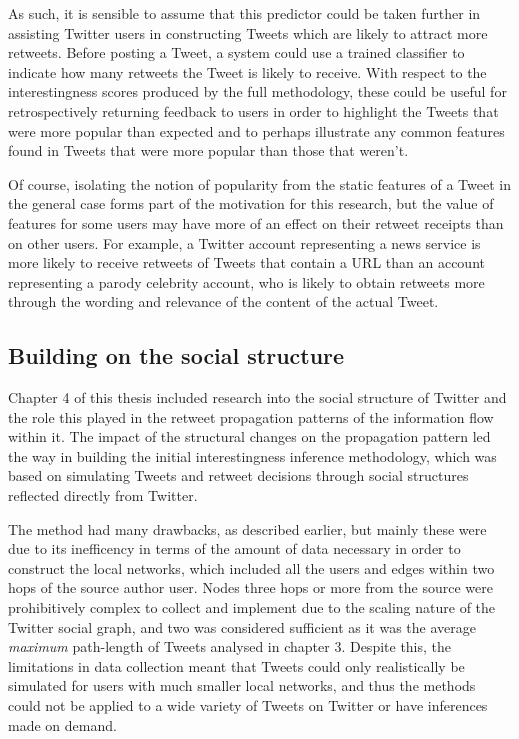As such, it is sensible to assume that this predictor could be taken further in assisting Twitter users in constructing Tweets which are likely to attract more retweets. Before posting a Tweet, a system could use a trained classifier to indicate how many retweets the Tweet is likely to receive. With respect to the interestingness scores produced by the full methodology, these could be useful for retrospectively returning feedback to users in order to highlight the Tweets that were more popular than expected and to perhaps illustrate any common features found in Tweets that were more popular than those that weren't. 

Of course, isolating the notion of popularity from the static features of a Tweet in the general case forms part of the motivation for this research, but the value of features for some users may have more of an effect on their retweet receipts than on other users. For example, a Twitter account representing a news service is more likely to receive retweets of Tweets that contain a URL than an account representing a parody celebrity account, who is likely to obtain retweets more through the wording and relevance of the content of the actual Tweet.


\subsection{Building on the social structure}
Chapter 4 of this thesis included research into the social structure of Twitter and the role this played in the retweet propagation patterns of the information flow within it. The impact of the structural changes on the propagation pattern led the way in building the initial interestingness inference methodology, which was based on simulating Tweets and retweet decisions through social structures reflected directly from Twitter.

The method had many drawbacks, as described earlier, but mainly these were due to its inefficency in terms of the amount of data necessary in order to construct the local networks, which included all the users and edges within two hops of the source author user. Nodes three hops or more from the source were prohibitively complex to collect and implement due to the scaling nature of the Twitter social graph, and two was considered sufficient as it was the average \textit{maximum} path-length of Tweets analysed in chapter 3. Despite this, the limitations in data collection meant that Tweets could only realistically be simulated for users with much smaller local networks, and thus the methods could not be applied to a wide variety of Tweets on Twitter or have inferences made on demand.

